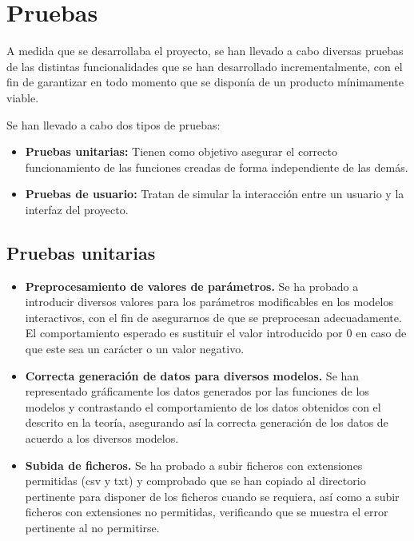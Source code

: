 \section{Pruebas}

A medida que se desarrollaba el proyecto, se han llevado a cabo diversas pruebas de las distintas funcionalidades que se han desarrollado incrementalmente, con el fin de garantizar en todo momento que se disponía de un producto mínimamente viable.

Se han llevado a cabo dos tipos de pruebas:

\begin{itemize}
\item \textbf{Pruebas unitarias:} Tienen como objetivo asegurar el correcto funcionamiento de las funciones creadas de forma independiente de las demás. 
\item \textbf{Pruebas de usuario:} Tratan de simular la interacción entre un usuario y la interfaz del proyecto.
\end{itemize}

\subsection{Pruebas unitarias}

\begin{itemize}
\item \textbf{Preprocesamiento de valores de parámetros.} Se ha probado a introducir diversos valores para los parámetros modificables en los modelos interactivos, con el fin de asegurarnos de que se preprocesan adecuadamente. El comportamiento esperado es sustituir el valor introducido por $0$ en caso de que este sea un carácter o un valor negativo.
\item \textbf{Correcta generación de datos para diversos modelos.} Se han representado gráficamente los datos generados por las funciones de los modelos y contrastando el comportamiento de los datos obtenidos con el descrito en la teoría, asegurando así la correcta generación de los datos de acuerdo a los diversos modelos.
\item \textbf{Subida de ficheros.} Se ha probado a subir ficheros con extensiones permitidas (csv y txt) y comprobado que se han copiado al directorio pertinente para disponer de los ficheros cuando se requiera, así como a subir ficheros con extensiones no permitidas, verificando que se muestra el error pertinente al no permitirse.
\end{itemize}

